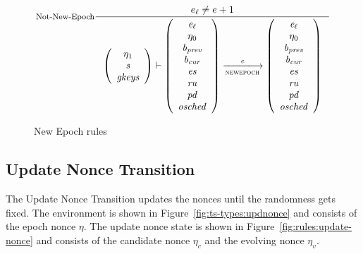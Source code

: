 \begin{figure}[ht]
  \begin{equation}\label{eq:not-new-epoch}
    \inference[Not-New-Epoch]
    {
      e_\ell \neq e + 1
    }
    {
      \left(
        {\begin{array}{c}
            \eta_1 \\
            \var{s} \\
            \var{gkeys} \\
        \end{array}}
      \right)
      \vdash
      {\left(\begin{array}{c}
            \var{e_\ell} \\
            \eta_0 \\
            \var{b_{prev}} \\
            \var{b_{cur}} \\
            \var{es} \\
            \var{ru} \\
            \var{pd} \\
            \var{osched}
      \end{array}\right)}
      \trans{newepoch}{\var{e}}
      {\left(\begin{array}{c}
            \var{e_\ell} \\
            \eta_0 \\
            \var{b_{prev}} \\
            \var{b_{cur}} \\
            \var{es} \\
            \var{ru} \\
            \var{pd} \\
            \var{osched}
      \end{array}\right)}
    }
  \end{equation}
  \caption{New Epoch rules}
  \label{fig:rules:new-epoch}
\end{figure}

\clearpage

\subsection{Update Nonce Transition}
\label{sec:update-nonces-trans}

The Update Nonce Transition updates the nonces until the randomness gets
fixed. The environment is shown in Figure~\ref{fig:ts-types:updnonce} and
consists of the epoch nonce $\eta$. The update nonce state is shown in
Figure~\ref{fig:rules:update-nonce} and consists of the candidate nonce
$\eta_c$ and the evolving nonce $\eta_v$.

